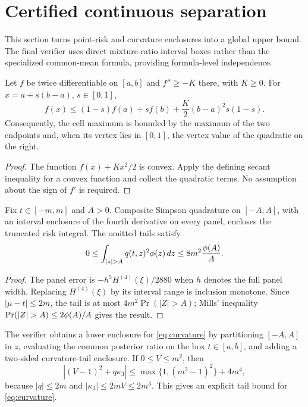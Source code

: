 \section{Certified continuous separation}
\label{sec:separation}

This section turns point-risk and curvature enclosures into a global upper
bound.  The final verifier uses direct mixture-ratio interval boxes rather
than the specialized common-mean formula, providing formula-level
independence.

\begin{lemma}
\label{lem:secant}
Let $f$ be twice differentiable on $[a,b]$ and $f''\ge-K$ there, with $K\ge0$.
For $x=a+s(b-a)$, $s\in[0,1]$,
\[
 f(x)\le(1-s)f(a)+sf(b)+\frac{K}{2}(b-a)^2s(1-s).
 \label{eq:secant}
\]
Consequently, the cell maximum is bounded by the maximum of the two endpoints
and, when its vertex lies in $[0,1]$, the vertex value of the quadratic on the
right.
\end{lemma}

\begin{proof}
The function $f(x)+Kx^2/2$ is convex.  Apply the defining secant inequality
for a convex function and collect the quadratic terms.  No assumption about
the sign of $f'$ is required.
\end{proof}

\begin{proposition}
\label{prop:quadrature}
Fix $t\in[-m,m]$ and $A>0$.  Composite Simpson quadrature on $[-A,A]$,
with an interval enclosure of the fourth derivative on every panel, encloses
the truncated risk integral.  The omitted tails satisfy
\[
 0\le\int_{|z|>A}q(t,z)^2\phiN(z)\,dz
 \le 8m^2\frac{\phiN(A)}{A}.
\]
\end{proposition}

\begin{proof}
The panel error is $-h^5H^{(4)}(\xi)/2880$ when $h$ denotes the full panel
width.  Replacing $H^{(4)}(\xi)$ by its interval range is inclusion
monotone.  Since $|\mu-t|\le2m$, the tail is at most
$4m^2\Pr(|Z|>A)$; Mills' inequality
$\Pr(|Z|>A)\le2\phiN(A)/A$ gives the result.
\end{proof}

The verifier obtains a lower enclosure for \eqref{eq:curvature} by partitioning
$[-A,A]$ in $z$, evaluating the common posterior ratio on the box
$t\in[a,b]$, and adding a two-sided curvature-tail enclosure.  If
$0\le V\le m^2$, then
\[
 |(V-1)^2+q\kappa_3|
 \le \max\{1,(m^2-1)^2\}+4m^4,
\]
because $|q|\le2m$ and
$|\kappa_3|\le2mV\le2m^3$.  This gives an explicit tail bound for
\eqref{eq:curvature}.

